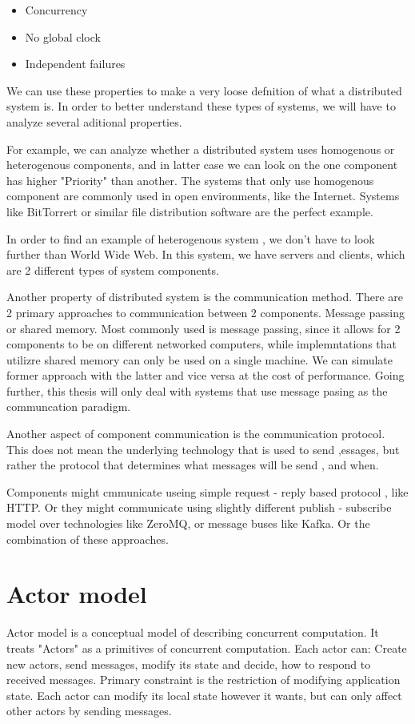 \begin{itemize}
    \item Concurrency
    \item No global clock
    \item Independent failures
\end{itemize}

We can use these properties to make a very loose defnition of what a distributed system is. In order to better understand these
types of systems, we will have to analyze several aditional properties.

For example, we can analyze whether a distributed system uses homogenous or heterogenous components, and in latter case we can look
on the one component has higher "Priority" than another. The systems that only use homogenous component are commonly used in open
environments, like the Internet. Systems like BitTorrert or similar file distribution software are the perfect example.

In order to find an example of heterogenous system , we don't have to look further than World Wide Web. In this system,
we have servers and clients, which are 2 different types of system components.


Another property of distributed system is the communication method. There are 2 primary approaches to communication between 2 components. Message passing or shared
memory. Most commonly used is message passing, since it allows for 2 components to be on different networked computers, while implemntations that utilizre
shared memory can only be used on a single machine. We can simulate former approach with the latter and vice versa at the cost of performance.
Going further, this thesis will only deal with systems that use message pasing as the communcation paradigm.

Another aspect of component communication is the communication protocol. This does not mean the underlying technology that is used to send ,essages, but rather
the protocol that determines what messages will be send , and when.

Components might cmmunicate useing simple request - reply based protocol , like HTTP. Or they might communicate using slightly different
publish - subscribe model over technologies like ZeroMQ, or message buses like Kafka. Or the combination of these approaches.


\section{Actor model}
Actor model is a conceptual model of describing concurrent computation. It treats "Actors" as a primitives of concurrent
computation. Each actor can: Create new actors, send messages, modify its state and decide, how to respond to
received messages. Primary constraint is the restriction of modifying application state.
Each actor can modify its local state however it wants, but can only affect other actors by sending messages.

